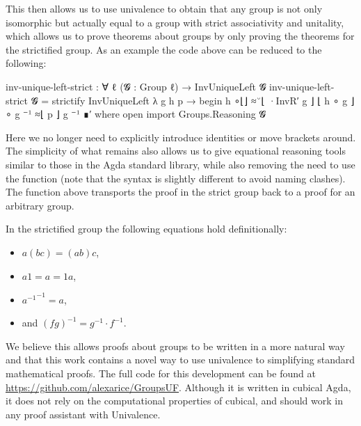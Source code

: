 \documentclass{article}
\begin{document}
This then allows us to use univalence to obtain that any group is not only isomorphic but actually equal to a group with strict associativity and unitality, which allows us to prove theorems about groups by only proving the theorems for the strictified group. As an example the code above can be reduced to the following:
\begin{code}
inv-unique-left-strict : ∀ {ℓ} (𝓖 : Group ℓ) → InvUniqueLeft 𝓖
inv-unique-left-strict 𝓖 = strictify InvUniqueLeft
  λ g h p → begin
    h ∘⌊⌋            ≈˘⌊ ·InvR′ g ⌋
    ⌊ h ∘ g ⌋∘ g ⁻¹  ≈⌊  p      ⌋
    g ⁻¹ ∎′
  where
    open import Groups.Reasoning 𝓖
\end{code}
Here we no longer need to explicitly introduce identities or move brackets around. The simplicity of what remains also allows us to give equational reasoning tools similar to those in the Agda standard library, while also removing the need to use the  function (note that the syntax is slightly different to avoid naming clashes). The function  above transports the proof in the strict group back to a proof for an arbitrary group.

In the strictified group the following equations hold definitionally:
\begin{itemize}
\item \(a  (b c) = (a b) c\),
\item \(a 1 = a = 1 a\),
\item \({a^{-1}}^{-1} = a\),
\item and \((f g)^{-1} = g^{-1} \cdot f^{-1}\).
\end{itemize}
We believe this allows proofs about groups to be written in a more natural way and that this work contains a novel way to use univalence to simplifying standard mathematical proofs. The full code for this development can be found at \url{https://github.com/alexarice/GroupsUF}. Although it is written in cubical Agda, it does not rely on the computational properties of cubical, and should work in any proof assistant with Univalence.
\end{document}
